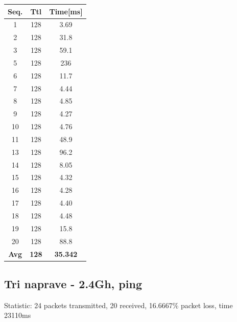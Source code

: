\documentclass[11pt,a4paper,slovene]{article}
\begin{document}
\begin{table}[H]
	\begin{adjustwidth}{-3cm}{-3cm}
	\centering
		\begin{tabular}{c|c|c}
		\hline
		\textbf{Seq.} & \textbf{Ttl} & \textbf{Time[ms]}\\
     		\hline
     		1 & 128 & 3.69\\
  		2 & 128 & 31.8\\
  		3 & 128 & 59.1\\
  		5 & 128 & 236\\
  		6 & 128 & 11.7\\
  		7 & 128 & 4.44\\
  		8 & 128 & 4.85\\
  		9 & 128 & 4.27\\
  		10 & 128 & 4.76\\
  		11 & 128 & 48.9\\
  		13 & 128 & 96.2\\
  		14 & 128 & 8.05\\
  		15 & 128 & 4.32\\
  		16 & 128 & 4.28\\
  		17 & 128 & 4.40\\
  		18 & 128 & 4.48\\
  		19 & 128 & 15.8\\
  		20 & 128 & 88.8\\
  		\hline
  		\textbf{Avg} & \textbf{128} & \textbf{35.342}\\
  		\hline
    		\end{tabular}
    	\end{adjustwidth}
\end{table}

\subsection{Tri naprave - 2.4Gh, ping}

Statistic: 24 packets transmitted, 20 received, 16.6667\% packet loss, time 23110ms
 
\end{document}
